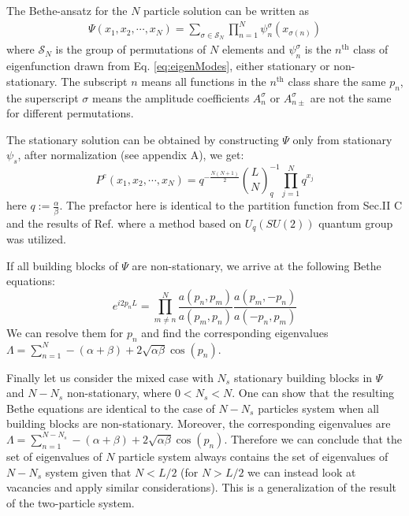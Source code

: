 \documentclass[aps,showpacs,twocolumn,floatfix,prx,superscriptaddress]{revtex4-1}
\begin{document}
The Bethe-ansatz for the $N$ particle solution can be written as
\begin{equation}
    \label{eq:ansatzN}
    \begin{aligned}
        \Psi(x_1, x_2, \cdots, x_N) = \sum_{\sigma\in \mathcal{S}_N}
        \prod_{n=1}^N \psi_n^{\sigma}(x_{\sigma(n)})
    \end{aligned}
\end{equation}
where $\mathcal{S}_N$ is the group of permutations of $N$ elements and $\psi_n^{\sigma}$ is the $n^{\text{th}}$ class of eigenfunction drawn from Eq.  \eqref{eq:eigenModes}, either stationary or non-stationary. The subscript $n$ means all functions in the $n^{\text{th}}$ class share the same $p_n$, the superscript $\sigma$ means the amplitude coefficients $A_n^{\sigma}$ or $A_{n\pm}^{\sigma}$ are not the same for different permutations.

The stationary solution can be obtained by constructing $\Psi$ only from stationary $\psi_s$, after normalization (see appendix A), we get: 
\begin{equation}
    \label{eq:stationarySolutionN}
    P^e(x_1, x_2, \cdots, x_N) = q^{-\frac{N(N+1)}{2}}
    \binom{L}{N}_q^{-1}\prod_{j=1}^N{q^{x_j}}
\end{equation}
here $q:=\frac{\alpha}{\beta}$. The prefactor here is identical to the partition function from Sec.II C and the results of Ref.\cite{} where a method based on $U_q(SU(2))$ quantum group was utilized.

If all building blocks of $\Psi$ are non-stationary, we arrive at the following Bethe equations:
\begin{equation}
    \label{eq:betheEqN}
    e^{i2p_nL}  =  \prod_{m\neq n}^N\frac{a(p_n, p_m)}{a(p_m, p_n)} 
    \frac{a(p_m, -p_n)}{a(-p_n, p_m)}
\end{equation}
We can resolve them for $p_n$ and find the corresponding eigenvalues $\Lambda=\sum_{n=1}^N -(\alpha+\beta) + 2\sqrt{\alpha\beta}\cos(p_n)$. 

Finally let us consider the mixed case with $N_s$ stationary building blocks in $\Psi$ and $N-N_s$ non-stationary, where $0<N_s<N$. One can show that the resulting Bethe equations are identical to the case of $N-N_s$ particles system when all building blocks are non-stationary. Moreover, the corresponding eigenvalues are $\Lambda = \sum_{n=1}^{N-N_s} -(\alpha+\beta)+2\sqrt{\alpha\beta}\cos(p_n)$. Therefore we can conclude that the set of eigenvalues of $N$ particle system always contains the set of eigenvalues of $N-N_s$ system given that $N<L/2$ (for $N>L/2$ we can instead look at vacancies and apply similar considerations). This is a generalization of the result of the two-particle system.
\end{document}

